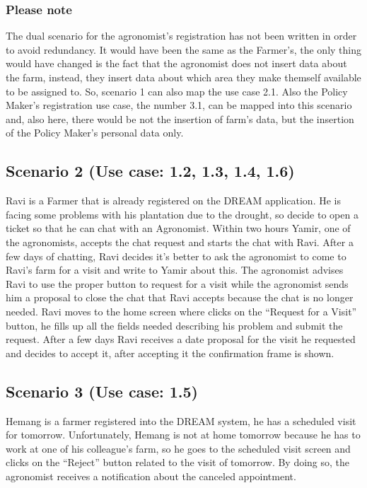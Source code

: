 \documentclass[10pt]{report}
\begin{document}
\subsubsection{Please note}
The dual scenario for the agronomist’s registration has not been written in order to avoid redundancy. It would have been the same as the Farmer’s, the only thing would have changed is the fact that the agronomist does not insert data about the farm, instead, they insert data about which area they make themself available to be assigned to. So, scenario 1 can also map the use case 2.1. Also the Policy Maker's registration use case, the number 3.1, can be mapped into this scenario and, also here, there would be not the insertion of farm's data, but the insertion of the Policy Maker's personal data only.

\subsection{Scenario 2 (Use case: 1.2, 1.3, 1.4, 1.6)}
Ravi is a Farmer that is already registered on the DREAM application. He is facing some problems with his plantation due to the drought, so decide to open a ticket so that he can chat with an Agronomist. Within two hours Yamir, one of the agronomists, accepts the chat request and starts the chat with Ravi. After a few days of chatting, Ravi decides it’s better to ask the agronomist to come to Ravi's farm for a visit and write to Yamir about this. The agronomist advises Ravi to use the proper button to request for a visit while the agronomist sends him a proposal to close the chat that Ravi accepts because the chat is no longer needed.
Ravi moves to the home screen where clicks on the “Request for a Visit” button, he fills up all the fields needed describing his problem and submit the request. 
After a few days Ravi receives a date proposal for the visit he requested and decides to accept it, after accepting it the confirmation frame is shown.  

\subsection{Scenario 3 (Use case: 1.5)}
Hemang is a farmer registered into the DREAM system, he has a scheduled visit for tomorrow. Unfortunately, Hemang is not at home tomorrow because he has to work at one of his colleague's farm, so he goes to the scheduled visit screen and clicks on the “Reject” button related to the visit of tomorrow. By doing so, the agronomist receives a notification about the canceled appointment.
\end{document}
